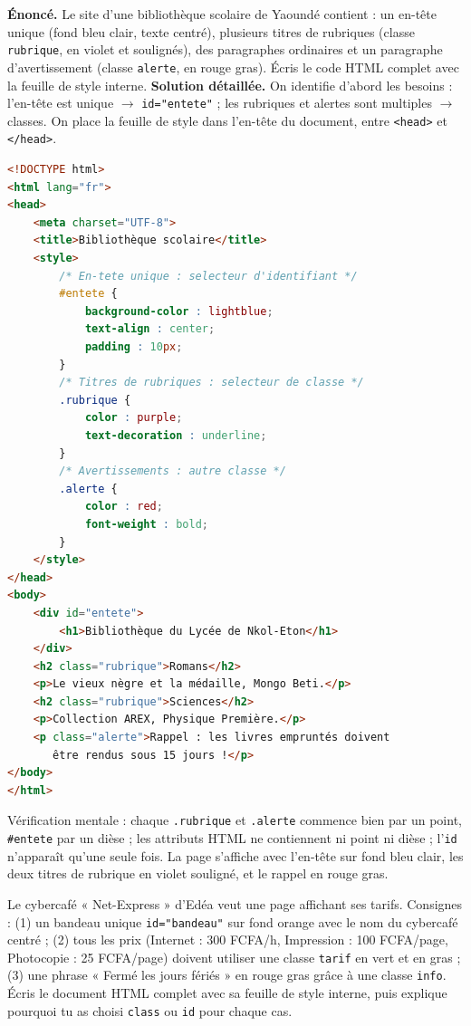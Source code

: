 \documentclass[11pt]{article}
\begin{document}
\begin{exoresolu}
\textbf{Énoncé.} Le site d'une bibliothèque scolaire de Yaoundé contient : un en-tête unique (fond bleu clair, texte centré), plusieurs titres de rubriques (classe \texttt{rubrique}, en violet et soulignés), des paragraphes ordinaires et un paragraphe d'avertissement (classe \texttt{alerte}, en rouge gras). Écris le code HTML complet avec la feuille de style interne.
\tcblower
\textbf{Solution détaillée.} On identifie d'abord les besoins : l'en-tête est unique $\rightarrow$ \texttt{id="entete"} ; les rubriques et alertes sont multiples $\rightarrow$ classes. On place la feuille de style dans l'en-tête du document, entre \texttt{<head>} et \texttt{</head>}.
\begin{lstlisting}[language=HTML]
<!DOCTYPE html>
<html lang="fr">
<head>
    <meta charset="UTF-8">
    <title>Bibliothèque scolaire</title>
    <style>
        /* En-tete unique : selecteur d'identifiant */
        #entete {
            background-color : lightblue;
            text-align : center;
            padding : 10px;
        }
        /* Titres de rubriques : selecteur de classe */
        .rubrique {
            color : purple;
            text-decoration : underline;
        }
        /* Avertissements : autre classe */
        .alerte {
            color : red;
            font-weight : bold;
        }
    </style>
</head>
<body>
    <div id="entete">
        <h1>Bibliothèque du Lycée de Nkol-Eton</h1>
    </div>
    <h2 class="rubrique">Romans</h2>
    <p>Le vieux nègre et la médaille, Mongo Beti.</p>
    <h2 class="rubrique">Sciences</h2>
    <p>Collection AREX, Physique Première.</p>
    <p class="alerte">Rappel : les livres empruntés doivent
       être rendus sous 15 jours !</p>
</body>
</html>
\end{lstlisting}
Vérification mentale : chaque \texttt{.rubrique} et \texttt{.alerte} commence bien par un point, \texttt{\#entete} par un dièse ; les attributs HTML ne contiennent ni point ni dièse ; l'\texttt{id} n'apparaît qu'une seule fois. La page s'affiche avec l'en-tête sur fond bleu clair, les deux titres de rubrique en violet souligné, et le rappel en rouge gras.
\end{exoresolu}

\begin{exercice}
Le cybercafé « Net-Express » d'Edéa veut une page affichant ses tarifs. Consignes : (1) un bandeau unique \texttt{id="bandeau"} sur fond orange avec le nom du cybercafé centré ; (2) tous les prix (Internet : 300 FCFA/h, Impression : 100 FCFA/page, Photocopie : 25 FCFA/page) doivent utiliser une classe \texttt{tarif} en vert et en gras ; (3) une phrase « Fermé les jours fériés » en rouge gras grâce à une classe \texttt{info}. Écris le document HTML complet avec sa feuille de style interne, puis explique pourquoi tu as choisi \texttt{class} ou \texttt{id} pour chaque cas.
\end{exercice}
\end{document}
